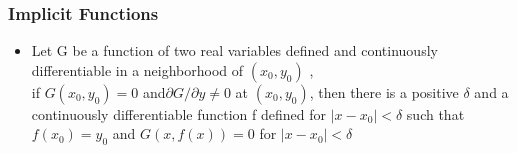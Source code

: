 \documentclass[notheorems,mathserif,table,compress]{beamer}  %
\begin{document}
\begin{frame}
  \frametitle{Implicit Functions}
  \begin{itemize}
\item Let G be a function of two real variables defined and continuously differentiable  in a neighborhood of $(x_0,y_0)$ ,\\
if $G(x_0,y_0)=0$ and$\partial G/\partial y\neq 0$ at $(x_0,y_0)$, then there is a positive $\delta$ and a continuously  differentiable function f defined  for $|x-x_0|<\delta$ such that $f(x_0)=y_0$ and  $G(x,f(x))=0$ for $|x-x_0|<\delta$ 


\end{itemize}
\end{frame}
\end{document}
